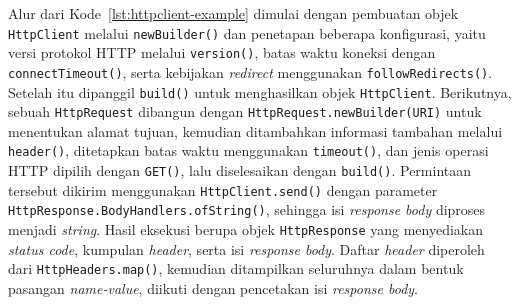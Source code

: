 Alur dari Kode~\ref{lst:httpclient-example} dimulai dengan pembuatan objek \texttt{HttpClient} melalui \texttt{newBuilder()} dan penetapan beberapa konfigurasi, yaitu versi protokol HTTP melalui \texttt{version()}, batas waktu koneksi dengan \texttt{connectTimeout()}, serta kebijakan \textit{redirect} menggunakan \texttt{followRedirects()}. Setelah itu dipanggil \texttt{build()} untuk menghasilkan objek \texttt{HttpClient}. Berikutnya, sebuah \texttt{HttpRequest} dibangun dengan \texttt{HttpRequest.newBuilder(URI)} untuk menentukan alamat tujuan, kemudian ditambahkan informasi tambahan melalui \texttt{header()}, ditetapkan batas waktu menggunakan \texttt{timeout()}, dan jenis operasi HTTP dipilih dengan \texttt{GET()}, lalu diselesaikan dengan \texttt{build()}. Permintaan tersebut dikirim menggunakan \texttt{HttpClient.send()} dengan parameter \texttt{HttpResponse.BodyHandlers.ofString()}, sehingga isi \textit{response body} diproses menjadi \textit{string}. Hasil eksekusi berupa objek \texttt{HttpResponse} yang menyediakan \textit{status code}, kumpulan \textit{header}, serta isi \textit{response body}. Daftar \textit{header} diperoleh dari \texttt{HttpHeaders.map()}, kemudian ditampilkan seluruhnya dalam bentuk pasangan \textit{name-value}, diikuti dengan pencetakan isi \textit{response body}.
